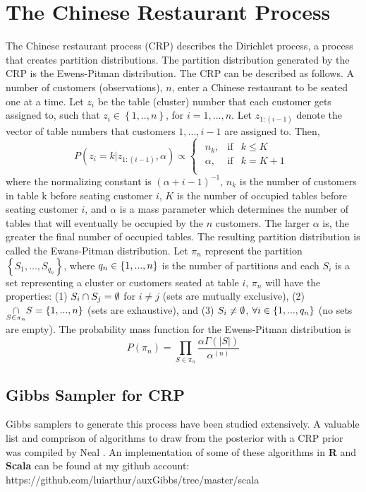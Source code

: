 \section{The Chinese Restaurant Process}
The Chinese restaurant process (CRP) describes the Dirichlet process, a process
that creates partition distributions. The partition distribution generated by
the CRP is the Ewens-Pitman distribution. The CRP can be described as follows.
A number of customers (observations), $n$, enter a Chinese restaurant to be
seated one at a time. Let $z_i$ be the table (cluster) number that each
customer gets assigned to, such that $z_i \in \left\{ 1,..,n \right\}$, for $i
= 1,...,n$. Let $z_{1:(i-1)}$ denote the vector of table numbers that customers
$1,...,i-1$ are assigned to. Then,
\begin{equation}
  P(z_i=k|z_{1:(i-1)},\alpha) \propto 
  \begin{cases}
    \begin{array}{rll}
      n_k,    & \text{if} & k \le K\\
      \alpha, & \text{if} & k = K+1\\
    \end{array}
  \end{cases}
\end{equation}
where the normalizing constant is ${(\alpha+i-1)}^{-1}$, $n_k$ is the number of
customers in table k before seating customer $i$, $K$ is the number of occupied
tables before seating customer $i$, and $\alpha$ is a mass parameter which
determines the number of tables that will eventually be occupied by the $n$
customers. The larger $\alpha$ is, the greater the final number of occupied
tables. The resulting partition distribution is called the Ewans-Pitman
distribution. Let $\pi_n$ represent the partition
$\left\{S_1,...,S_{q_n}\right\}$, where $q_n \in \left \{1,...,n\right \}$ is the number
of partitions and each $S_i$ is a set representing a cluster or customers
seated at table $i$, $\pi_n$ will have the properties: (1) $S_i \cap S_j = \emptyset$
for $i \ne j$ (sets are mutually exclusive), (2) $\underset{S \in \pi_n}{\cap}
S = \left \{ 1,...,n \right \}$ (sets are exhaustive), and (3) $S_i \ne \emptyset$, $\forall i
\in \left \{ 1,...,q_n\right \}$ (no sets are empty).  The probability mass function for
the Ewens-Pitman distribution is
\begin{equation}
  P(\pi_n) = \underset{S \in \pi_n}{\prod} 
             \frac{\alpha\Gamma(|S|)}{\alpha^{(n)}}
\end{equation}

\subsection{Gibbs Sampler for CRP}
Gibbs samplers to generate this process have been studied extensively.  A
valuable list and comprison of algorithms to draw from the posterior with a CRP
prior was compiled by Neal \citep{neal}. An implementation of some of these
algorithms in \textbf{R} and \textbf{Scala} can be found at my github account:
https://github.com/luiarthur/auxGibbs/tree/master/scala\\

